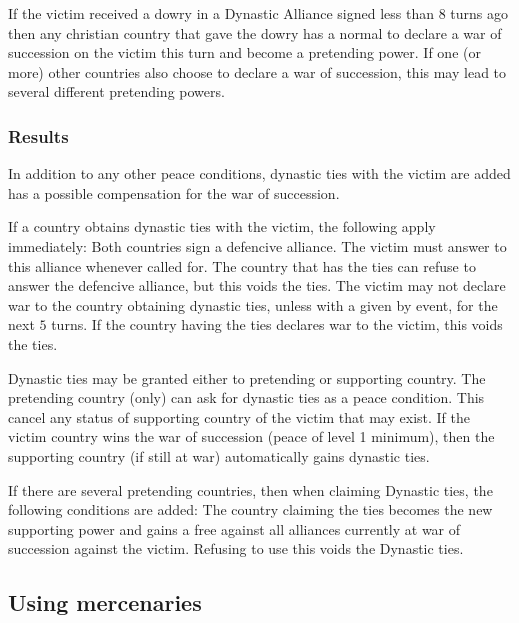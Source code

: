 \aparag If the victim received a dowry in a Dynastic Alliance signed less than
8 turns ago then any christian country that gave the dowry has a normal \CB to
declare a war of succession on the victim this turn and become a pretending
power.
\bparag If one (or more) other countries also choose to declare a war of
succession, this may lead to several different pretending powers.


\subsubsection{Results}
\aparag In addition to any other peace conditions, dynastic ties with the
victim are added has a possible compensation for the war of succession.

 If a country obtains dynastic ties with the victim, the
following apply immediately:
\bparag Both countries sign a defencive alliance. The victim must answer to
this alliance whenever called for. The country that has the ties can refuse to
answer the defencive alliance, but this voids the ties.
\bparag The victim may not declare war to the country obtaining dynastic ties,
unless with a \CB given by event, for the next $5$ turns.
\bparag If the country having the ties declares war to the victim, this voids
the ties.

 Dynastic ties may be granted either to
pretending or supporting country.
\bparag The pretending country (only) can ask for dynastic ties as a peace
condition. This cancel any status of supporting country of the victim that may
exist.
\bparag If the victim country wins the war of succession (peace of level 1
minimum), then the supporting country (if still at war) automatically gains
dynastic ties.

 If there are several pretending
countries, then when claiming Dynastic ties, the following conditions are
added:
\bparag The country claiming the ties becomes the new supporting power and
gains a free \CB against all alliances currently at war of succession against
the victim.
\bparag Refusing to use this \CB voids the Dynastic ties.



\subsection{Using mercenaries}\label{chSpecific:Mercenaries}

